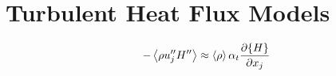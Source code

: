 \section{Turbulent Heat Flux Models}

\begin{equation}
-\left<{ \rho u''_j H''}\right> \approx \left<{\rho}\right> \alpha_t \frac{\partial \{{H}\}}{\partial {x_j}}
\end{equation}

